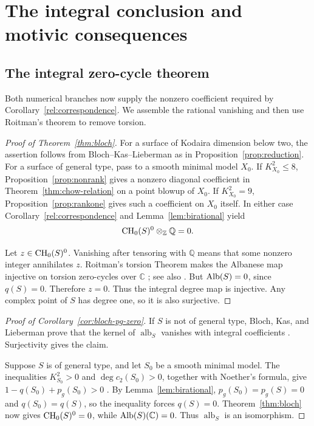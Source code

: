 \section{The integral conclusion and motivic consequences}\label{sec:conclusion}

\subsection{The integral zero-cycle theorem}\label{subsec:integral-proof}

Both numerical branches now supply the nonzero coefficient required
by Corollary~\ref{rel:correspondence}. We assemble the rational
vanishing and then use Roitman's theorem to remove torsion.

\begin{proof}[Proof of Theorem~\ref{thm:bloch}]
For a surface of Kodaira dimension below two, the assertion follows
from Bloch--Kas--Lieberman as in
Proposition~\ref{prop:reduction}. For a surface of general type,
pass to a smooth minimal model \(X_0\). If \(K_{X_0}^2\le8\),
Proposition~\ref{prop:nonrank} gives a nonzero diagonal coefficient
in Theorem~\ref{thm:chow-relation} on a point blowup of \(X_0\).
If \(K_{X_0}^2=9\), Proposition~\ref{prop:rankone} gives such a
coefficient on \(X_0\) itself. In either case
Corollary~\ref{rel:correspondence} and Lemma~\ref{lem:birational} yield
\[
\operatorname{CH}_0(S)^0\otimes_{\mathbb Z}\mathbb Q=0.
\]

Let \(z\in\operatorname{CH}_0(S)^0\). Vanishing after tensoring with
\(\mathbb Q\) means that some nonzero integer annihilates \(z\).
Roitman's torsion Theorem makes the Albanese map injective on torsion
zero-cycles over \(\mathbb C\)
\cite[Theorem~4.2]{BlochRoitman}; see also \cite{Roitman}.
But \(\operatorname{Alb}(S)=0\), since \(q(S)=0\). Therefore \(z=0\).
Thus the integral degree map is injective. Any complex point of
\(S\) has degree one, so it is also surjective.
\end{proof}

\begin{proof}[Proof of Corollary~\ref{cor:bloch-pg-zero}]
If \(S\) is not of general type, Bloch, Kas, and Lieberman prove that
the kernel of \(\operatorname{alb}_S\) vanishes with integral
coefficients \cite[pp.~135--136]{BKL}. Surjectivity gives the claim.

Suppose \(S\) is of general type, and let \(S_0\) be a smooth minimal
model. The inequalities \(K_{S_0}^2>0\) and \(\deg c_2(S_0)>0\),
together with Noether's formula, give
\(1-q(S_0)+p_g(S_0)>0\) \cite[Remark~1.3.1]{PedriniWeibel}.
By Lemma~\ref{lem:birational}, \(p_g(S_0)=p_g(S)=0\) and
\(q(S_0)=q(S)\), so the inequality forces \(q(S)=0\).
Theorem~\ref{thm:bloch} now gives \(\operatorname{CH}_0(S)^0=0\), while
\(\operatorname{Alb}(S)(\mathbb C)=0\). Thus \(\operatorname{alb}_S\) is an
isomorphism.
\end{proof}

